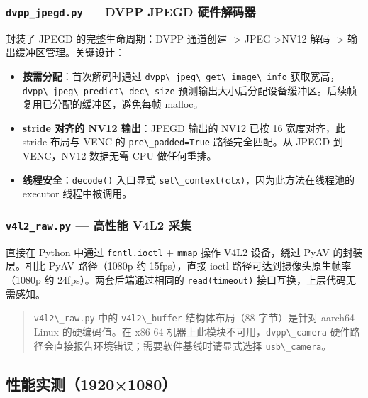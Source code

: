 \subsubsection{\texorpdfstring{\texttt{dvpp\_jpegd.py} --- DVPP JPEGD
硬件解码器}{dvpp\_jpegd.py --- DVPP JPEGD 硬件解码器}}\label{src-book-chapter6-h153}

封装了 JPEGD 的完整生命周期：DVPP 通道创建 -\textgreater{}
JPEG-\textgreater NV12 解码 -\textgreater{} 输出缓冲区管理。关键设计：

\begin{itemize}
\tightlist
\item
  \textbf{按需分配}：首次解码时通过
  \passthrough{\lstinline!dvpp\_jpeg\_get\_image\_info!}
  获取宽高，\passthrough{\lstinline!dvpp\_jpeg\_predict\_dec\_size!}
  预测输出大小后分配设备缓冲区。后续帧复用已分配的缓冲区，避免每帧
  malloc。
\item
  \textbf{stride 对齐的 NV12 输出}：JPEGD 输出的 NV12 已按 16
  宽度对齐，此 stride 布局与 VENC 的
  \passthrough{\lstinline!pre\_padded=True!} 路径完全匹配。从 JPEGD 到
  VENC，NV12 数据无需 CPU 做任何重排。
\item
  \textbf{线程安全}：\passthrough{\lstinline!decode()!} 入口显式
  \passthrough{\lstinline!set\_context(ctx)!}，因为此方法在线程池的
  executor 线程中被调用。
\end{itemize}

\subsubsection{\texorpdfstring{\texttt{v4l2\_raw.py} --- 高性能 V4L2
采集}{v4l2\_raw.py --- 高性能 V4L2 采集}}\label{src-book-chapter6-h154}

直接在 Python 中通过 \passthrough{\lstinline!fcntl.ioctl!} +
\passthrough{\lstinline!mmap!} 操作 V4L2 设备，绕过 PyAV 的封装层。相比
PyAV 路径（1080p 约 15fps），直接 ioctl 路径可达到摄像头原生帧率（1080p
约 24fps）。两套后端通过相同的 \passthrough{\lstinline!read(timeout)!}
接口互换，上层代码无需感知。

\begin{quote}
\passthrough{\lstinline!v4l2\_raw.py!} 中的
\passthrough{\lstinline!v4l2\_buffer!} 结构体布局（88 字节）是针对
aarch64 Linux 的硬编码值。在 x86-64
机器上此模块不可用，\passthrough{\lstinline!dvpp\_camera!}
硬件路径会直接报告环境错误；需要软件基线时请显式选择
\passthrough{\lstinline!usb\_camera!}。
\end{quote}

\subsection{性能实测（1920×1080）}\label{src-book-chapter6-h155}

